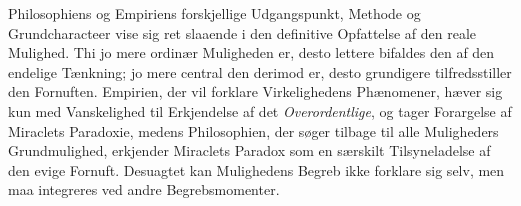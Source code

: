 \documentclass[12pt]{book}
\newcommand{\opage}[1]{\marginnote{\footnotesize\textit{[#1]}}}
\begin{document}
\opage{157} %
Philosophiens og Empiriens forskjellige Udgangspunkt, Methode og Grundcharacteer vise
sig ret slaaende i den definitive Opfattelse af den reale Mulighed. Thi jo mere
ordinær Muligheden er, desto lettere bifaldes den af den endelige Tænkning; jo mere
central den derimod er, desto grundigere tilfredsstiller den Fornuften. Empirien, der
vil forklare Virkelighedens Phænomener, hæver sig kun med Vanskelighed til Erkjendelse
af det \emph{Overordentlige}, og tager Forargelse af Miraclets Paradoxie, medens
Philosophien, der søger tilbage til alle Muligheders Grundmulighed, erkjender Miraclets
Paradox som en særskilt Tilsyneladelse af den evige Fornuft. Desuagtet kan Mulighedens
Begreb ikke forklare sig selv, men maa integreres ved andre Begrebsmomenter.
\end{document}
